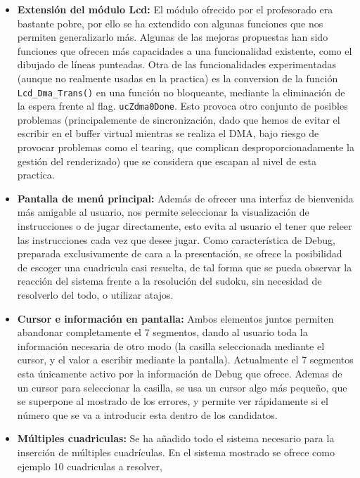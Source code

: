 \documentclass[12pt,letterpaper]{article}
\begin{document}
\begin{itemize}
  \item \textbf{Extensión del módulo Lcd:} El módulo ofrecido por el
    profesorado era bastante pobre, por ello se ha extendido con
    algunas funciones que nos permiten generalizarlo más. Algunas de
    las mejoras propuestas han sido funciones que ofrecen más
    capacidades a una funcionalidad existente, como el dibujado de
    líneas punteadas. Otra de las funcionalidades experimentadas
    (aunque no realmente usadas en la practica) es la conversion de la
    función \texttt{Lcd\_Dma\_Trans()} en una función no bloqueante,
    mediante la eliminación de la espera frente al flag.
    \texttt{ucZdma0Done}. Esto provoca otro conjunto de posibles
    problemas (principalemente de sincronización, dado que hemos de
    evitar el escribir en el buffer virtual mientras se realiza el
    DMA, bajo riesgo de provocar problemas como el tearing, que
    complican desproporcionadamente la gestión del renderizado) que se
    considera que escapan al nivel de esta practica.
  \item \textbf{Pantalla de menú principal:} Además de ofrecer una
    interfaz de bienvenida más amigable al usuario, nos permite
    seleccionar la visualización de instrucciones o de jugar
    directamente, esto evita al usuario el tener que releer las
    instrucciones cada vez que desee jugar. Como característica de
    Debug, preparada exclusivamente de cara a la presentación, se
    ofrece la posibilidad de escoger una cuadricula casi resuelta, de
    tal forma que se pueda observar la reacción del sistema frente a
    la resolución del sudoku, sin necesidad de resolverlo del todo, o
    utilizar atajos.
  \item \textbf{Cursor e información en pantalla:} Ambos elementos
    juntos permiten abandonar completamente el 7 segmentos, dando al
    usuario toda la información necesaria de otro modo (la casilla
    seleccionada mediante el cursor, y el valor a escribir mediante la
    pantalla). Actualmente el 7 segmentos esta únicamente activo por
    la información de Debug que ofrece. Ademas de un cursor para
    seleccionar la casilla, se usa un cursor algo más pequeño, que se
    superpone al mostrado de los errores, y permite ver rápidamente si
    el número que se va a introducir esta dentro de los candidatos.
  \item \textbf{Múltiples cuadriculas:} Se ha añadido todo el sistema
    necesario para la inserción de múltiples cuadrículas. En el
    sistema mostrado se ofrece como ejemplo 10 cuadriculas a resolver,

\end{itemize}
\end{document}
